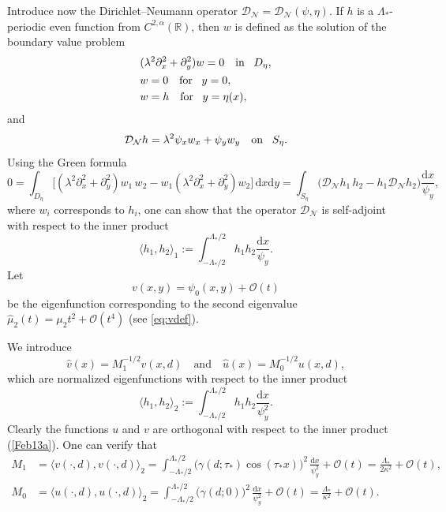 \documentclass[oneside,a4paper,11pt]{article}
\theoremstyle{thmstyletwo}%
\theoremstyle{thmstylethree}%
\numberwithin{equation}{section}
\def\D{\mathrm{d}}
\def\gamm{\gamma}
\def\taust{\tau_{*}}
\def\DN{\mathcal{D}_{\mathcal{N}}}
\def\Obig{\mathcal{O}}
\begin{document}
Introduce now the Dirichlet--Neumann operator $\DN=\DN(\psi,\eta)$. If $h$ is a \mbox{$\Lambda_*$-}pe\-ri\-od\-ic even function from $C^{2,\alpha}(\mathbb{R})$, then $w$ is defined as the solution of the boundary value problem
\begin{equation*} %
\begin{aligned}
& (\lambda^2\partial_x^2+\partial_y^2)w=0\quad\mbox{in\!}\quad D_\eta,\\
&w=0\quad\mbox{for\!}\quad y=0,\\
&w=h\quad\mbox{for\!}\quad y=\eta(x),
\end{aligned}
\end{equation*}
and
\begin{equation*} %
\DN h=\lambda^2\psi_xw_x+\psi_yw_y\quad\mbox{on\!}\quad S_\eta.
\end{equation*}
Using the Green formula
$$
0=\int_{D_\eta} \bigl[(\lambda^2\partial_x^2+\partial_y^2)w_1\,w_2-w_1(\lambda^2\partial_x^2+\partial_y^2)w_2\bigr]\,\D x \D y=\int_{S_\eta}\bigl(\DN h_1 \, h_2-h_1\DN h_2\bigr)\frac{\D x}{\psi_y},
$$
where $w_i$ corresponds to $h_i$, one can show that the operator $\DN$ is self-adjoint with respect to the inner product
 \begin{equation*}%
\langle h_1,h_2\rangle_1:=\int_{-\Lambda_*/2}^{\Lambda_*/2}h_1 h_2 \frac{\D x}{\psi_y}.
\end{equation*}
Let
$$
 v(x,y)=\psi_0(x,y)+\Obig(t)
$$
be the eigenfunction corresponding to the second eigenvalue $\widehat{\mu}_2(t)=\mu_2t^2+\Obig(t^4)$ (see \eqref{eq:vdef}).

We introduce
$$
\widehat{v}(x)=M_1^{-1/2}v(x,d)\quad\mbox{and}\quad\widehat{u}(x)=M_0^{-1/2}u(x,d),
$$
which are normalized eigenfunctions with respect to the inner product
 \begin{equation}\label{Feb13a}
 \langle h_1,h_2\rangle_2:=\int_{-\Lambda_*/2}^{\Lambda_*/2}h_1 h_2 \frac{\D x}{\psi^2_y}.
 \end{equation}
Clearly the functions $u$ and $v$ are orthogonal with respect to the inner product (\ref{Feb13a}).  One can verify that
\begin{align*}
 M_1&=\langle v(\cdot,d),v(\cdot,d)\rangle_2=\int_{-\Lambda_*/2}^{\Lambda_*/2}\bigl(\gamm(d;\taust)\cos(\taust x)\bigr)^2 \,\frac{\D x}{\psi^2_y}+\Obig(t)=\frac{\Lambda_*}{2\kappa^2}+\Obig(t),\\
 M_0&=\langle u(\cdot,d),u(\cdot,d)\rangle_2=\int_{-\Lambda_*/2}^{\Lambda_*/2} \bigl(\gamm(d;0)\bigr)^2\,\frac{\D x}{\psi^2_y}+\Obig(t)=\frac{\Lambda_*}{\kappa^2}+\Obig(t).
\end{align*}
\end{document}
